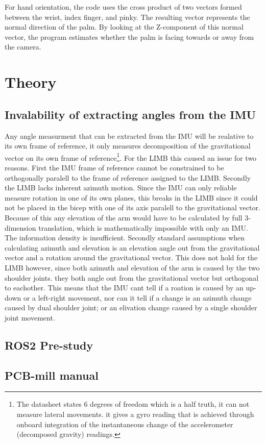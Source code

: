 \documentclass[a4paper]{article}
\begin{document}
For hand orientation, the code uses the cross product of two vectors formed between the wrist, index finger, and pinky. The resulting vector represents the normal direction of the palm. By looking at the Z-component of this normal vector, the program estimates whether the palm is facing towards or away from the camera.


\section{Theory}

\subsection{Invalability of extracting angles from the IMU}

Any angle measurment that can be extracted from the IMU will be realative to its own frame of reference, it only measures decomposition
of the gravitational vector on its own frame of reference\footnote{
    The datasheet states 6 degrees of freedom which is a half truth, it can not measure lateral movements. it gives a gyro
    reading that is achieved through onboard integration of the instantaneous change of the accelerometer (decomposed gravity) readings.
}. For the LIMB this caused an issue for two reasons.
First the IMU frame of reference cannot be constrained to be orthogonally paralell to the frame of reference assigned to the LIMB. Secondly the LIMB lacks inherent
azimuth motion. Since the IMU can only reliable measure rotation in one of its own planes, this breaks in the LIMB since it could not be placed in the bicep with one 
of its axis paralell to the gravitational vector. Because of this any elevation of the arm would have to be calculated by full 3-dimension translation, which is mathematically
impossible with only an IMU. The information density is insufficient. Secondly standard assumptions when calculating azimuth and elevation is an elevation angle out from the gravitational vector
and a rotation around the gravitational vector. This does not hold for the LIMB however, since both azimuth and elevation of the arm is caused
by the two shoulder joints. they both angle out from the gravitational vector but orthogonal to eachother. This means that the IMU cant tell if a roation is caused by an up-down or a left-right movement,
nor can it tell if a change is an azimuth change caused by dual shoulder joint; or an elivation change caused by a single shoulder joint movement.

\subsection{ROS2 Pre-study}


\subsection{PCB-mill manual}

\end{document}
